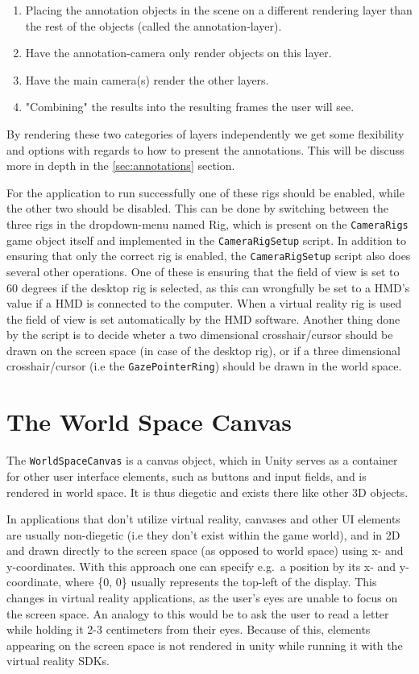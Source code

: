 \begin{enumerate}
	\item Placing the annotation objects in the scene on a different rendering layer than the rest of the objects (called the annotation-layer).
	\item Have the annotation-camera only render objects on this layer.
	\item Have the main camera(s) render the other layers.
	\item "Combining" the results into the resulting frames the user will see.
\end{enumerate}

By rendering these two categories of layers independently we get some flexibility and options with regards to how to present the annotations.
This will be discuss more in depth in the \ref{sec:annotations} section.

For the application to run successfully one of these rigs should be enabled, while the other two should be disabled.
This can be done by switching between the three rigs in the dropdown-menu named Rig, which is present on the \texttt{CameraRigs} game object itself and
implemented in the \texttt{CameraRigSetup} script. In addition to ensuring that only the correct rig is enabled, 
the \texttt{CameraRigSetup} script also does several other operations. One of these is ensuring that the field of view is set to 60 degrees if the desktop rig 
is selected, as this can wrongfully be set to a HMD's value if a HMD is connected to the computer. When a virtual reality rig is used the field of view is 
set automatically by the HMD software. Another thing done by the script is to decide wheter a two dimensional crosshair/cursor should be drawn on the screen space
(in case of the desktop rig), or if a three dimensional crosshair/cursor (i.e the \texttt{GazePointerRing}) should be drawn in the world space. 


\section{The World Space Canvas}
The \texttt{WorldSpaceCanvas} is a canvas object, which in Unity serves as a container for other user interface elements, such as buttons and input fields, 
and is rendered in world space. It is thus diegetic and exists there like other 3D objects.

In applications that don't utilize virtual reality, canvases and other UI elements are usually non-diegetic (i.e they don't exist within the game world), 
and in 2D and drawn directly to the screen space (as opposed to world space) using x- and y-coordinates.
With this approach one can specify e.g.~a position by its x- and y-coordinate, where \{0, 0\} usually represents the top-left of the display.
This changes in virtual reality applications, as the user's eyes are unable to focus on the screen space. An analogy to this would be to 
ask the user to read a letter while holding it 2-3 centimeters from their eyes. Because of this, elements appearing on the screen space is not rendered
in unity while running it with the virtual reality SDKs. 

